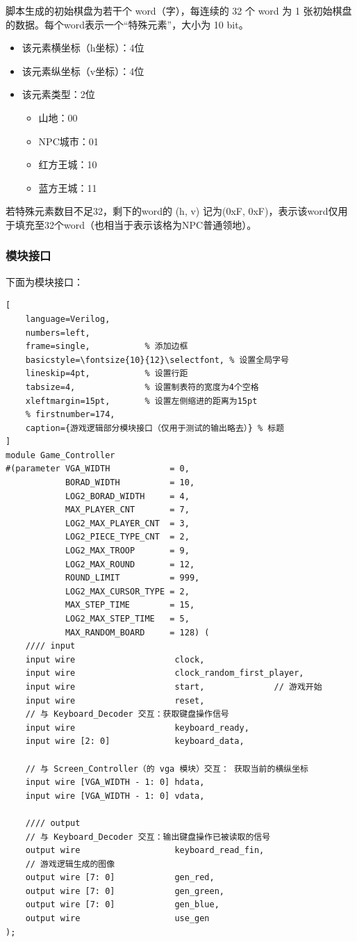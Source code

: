 脚本生成的初始棋盘为若干个 word（字），每连续的 32 个 word 为 1 张初始棋盘的数据。每个word表示一个“特殊元素”，大小为 10 bit。
\begin{itemize}
    \item 该元素横坐标（h坐标）：4位
    \item 该元素纵坐标（v坐标）：4位
    \item 该元素类型：2位
        \begin{itemize}
            \item 山地：00
            \item NPC城市：01
            \item 红方王城：10
            \item 蓝方王城：11
        \end{itemize}
\end{itemize}

若特殊元素数目不足32，剩下的word的 (h, v) 记为(0xF, 0xF)，表示该word仅用于填充至32个word（也相当于表示该格为NPC普通领地）。


\subsubsection{模块接口}
下面为模块接口：

\begin{lstlisting}[
    language=Verilog,
    numbers=left,
    frame=single,           % 添加边框
    basicstyle=\fontsize{10}{12}\selectfont, % 设置全局字号
    lineskip=4pt,           % 设置行距
    tabsize=4,              % 设置制表符的宽度为4个空格
    xleftmargin=15pt,       % 设置左侧缩进的距离为15pt
    % firstnumber=174,
    caption={游戏逻辑部分模块接口（仅用于测试的输出略去）} % 标题
]
module Game_Controller
#(parameter VGA_WIDTH            = 0, 
            BORAD_WIDTH          = 10, 
            LOG2_BORAD_WIDTH     = 4, 
            MAX_PLAYER_CNT       = 7, 
            LOG2_MAX_PLAYER_CNT  = 3, 
            LOG2_PIECE_TYPE_CNT  = 2, 
            LOG2_MAX_TROOP       = 9, 
            LOG2_MAX_ROUND       = 12,
            ROUND_LIMIT          = 999,
            LOG2_MAX_CURSOR_TYPE = 2,
            MAX_STEP_TIME        = 15,
            LOG2_MAX_STEP_TIME   = 5,
            MAX_RANDOM_BOARD     = 128) (
    //// input
    input wire                    clock,
    input wire                    clock_random_first_player,
    input wire                    start,              // 游戏开始
    input wire                    reset,
    // 与 Keyboard_Decoder 交互：获取键盘操作信号 
    input wire                    keyboard_ready,
    input wire [2: 0]             keyboard_data,

    // 与 Screen_Controller（的 vga 模块）交互： 获取当前的横纵坐标
    input wire [VGA_WIDTH - 1: 0] hdata,
    input wire [VGA_WIDTH - 1: 0] vdata,

    //// output
    // 与 Keyboard_Decoder 交互：输出键盘操作已被读取的信号
    output wire                   keyboard_read_fin,  
    // 游戏逻辑生成的图像
    output wire [7: 0]            gen_red,
    output wire [7: 0]            gen_green,
    output wire [7: 0]            gen_blue,
    output wire                   use_gen
);
\end{lstlisting}

